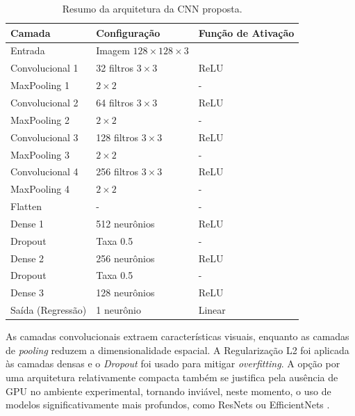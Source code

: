 \documentclass[sigconf,nonacm,screen]{acmart}
\begin{document}
\begin{table}[h]
\caption{Resumo da arquitetura da CNN proposta.}
\label{tab:arquitetura}
\centering
\begin{tabular}{@{}lll@{}}
\toprule
\textbf{Camada} & \textbf{Configuração} & \textbf{Função de Ativação} \\
\midrule
Entrada          & Imagem $128 \times 128 \times 3$ &             \\
\midrule
Convolucional 1  & 32 filtros $3 \times 3$          & ReLU        \\
MaxPooling 1     & $2 \times 2$                     & -           \\
\midrule
Convolucional 2  & 64 filtros $3 \times 3$          & ReLU        \\
MaxPooling 2     & $2 \times 2$                     & -           \\
\midrule
Convolucional 3  & 128 filtros $3 \times 3$         & ReLU        \\
MaxPooling 3     & $2 \times 2$                     & -           \\
\midrule
Convolucional 4  & 256 filtros $3 \times 3$         & ReLU        \\
MaxPooling 4     & $2 \times 2$                     & -           \\
\midrule
Flatten          & -                                & -           \\
\midrule
Dense 1          & 512 neurônios                    & ReLU        \\
Dropout          & Taxa 0.5                         & -           \\
\midrule
Dense 2          & 256 neurônios                    & ReLU        \\
Dropout          & Taxa 0.5                         & -           \\
\midrule
Dense 3          & 128 neurônios                    & ReLU        \\
\midrule
Saída (Regressão)& 1 neurônio                      & Linear      \\
\bottomrule
\end{tabular}
\end{table}

As camadas convolucionais extraem características visuais, enquanto as camadas de \textit{pooling} reduzem a dimensionalidade espacial. A Regularização L2 foi aplicada às camadas densas e o \textit{Dropout} foi usado para mitigar \textit{overfitting}. A opção por uma arquitetura relativamente compacta também se justifica pela ausência de GPU no ambiente experimental, tornando inviável, neste momento, o uso de modelos significativamente mais profundos, como ResNets ou EfficientNets \cite{Goodfellow2016}.
\end{document}
